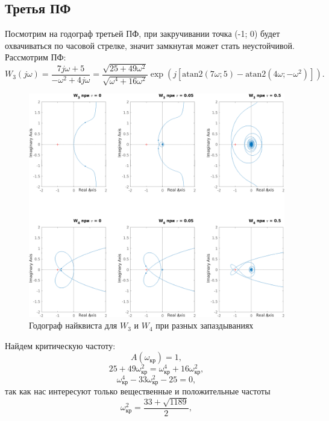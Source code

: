 \subsection{Третья ПФ}
Посмотрим на годограф третьей ПФ, при закручивании
точка (-1; 0) будет охвачиваться по часовой стрелке, значит замкнутая 
может стать неустойчивой.
Рассмотрим ПФ:
\begin{equation*}
    W_3(j\omega)=\frac{7j\omega+5}{-\omega^2+4j\omega}
    =\frac{\sqrt{25+49\omega^2}}{\sqrt{\omega^4+16\omega^2}}\exp \left( j \left[ \text{atan2}(7\omega;5) - \text{atan2}(4\omega;-\omega^2) \right] \right).
\end{equation*}
\begin{figure}[H]
    \centering
    \includegraphics[width=\textwidth]{figs/task_3_taus_nyaquist.png}
    \caption{Годограф найквиста для $W_3$ и $W_4$ при разных запаздываниях}
    \label{fig:W34_nyquist}
\end{figure}
Найдем критическую частоту:
\begin{equation*}
    A(\omega_\text{кр})=1,
\end{equation*}
$$
25+49\omega_\text{кр}^2=\omega_\text{кр}^4+16\omega_\text{кр}^2,
$$
\begin{equation*}
    \omega_\text{кр}^4-33\omega_\text{кр}^2-25=0,
\end{equation*}
так как нас интересуют только вещественные и положительные частоты
\begin{equation*}
    \omega_\text{кр}^2=\frac{33+\sqrt{1189}}{2},
\end{equation*}
